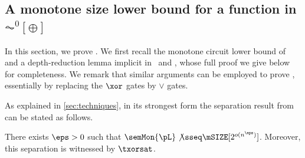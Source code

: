 \documentclass[11pt]{article}
\begin{document}
\subsection{A monotone size  lower bound for a function in $\AC^0[\oplus]$}
\label{s:ac0-mp}

In this section, we prove .
We first recall the monotone circuit lower bound of~\cite{gkrs19}
and a depth-reduction lemma implicit in~\cite{AKRRV01} and \citep{DBLP:conf/coco/OliveiraS019},
whose full proof we give below for completeness.
We remark that similar arguments can be employed
to prove ,
essentially by replacing the $\xor$ gates by $\lor$ gates.

As explained in \cref{sec:techniques}, in its strongest form the separation result from \citep{gkrs19} can be stated as follows.

\begin{theorem}
    \label{thm:xor-sat}
    There exists $\eps > 0$ 
    such that 
    $\semMon{\pL} \not\sseq \mSIZE[2^{o(n^{\eps})}]$.
    Moreover, 
    this separation is witnessed by $\txorsat$.
\end{theorem}
\end{document}
